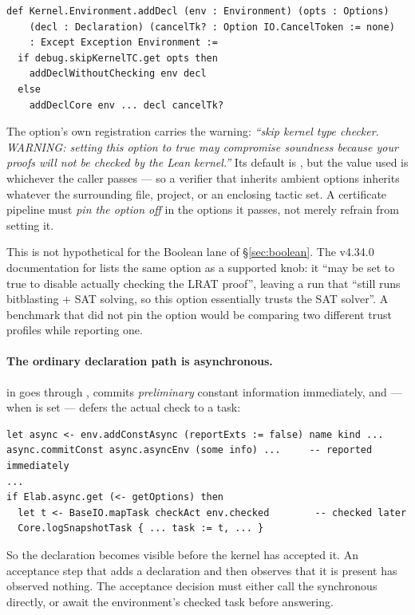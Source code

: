 \begin{lstlisting}
def Kernel.Environment.addDecl (env : Environment) (opts : Options)
    (decl : Declaration) (cancelTk? : Option IO.CancelToken := none)
    : Except Exception Environment :=
  if debug.skipKernelTC.get opts then
    addDeclWithoutChecking env decl
  else
    addDeclCore env ... decl cancelTk?
\end{lstlisting}

The option's own registration carries the warning: \emph{``skip kernel type
checker. WARNING: setting this option to true may compromise soundness because
your proofs will not be checked by the Lean kernel.''} Its default is
, but the value used is whichever  the caller passes
--- so a verifier that inherits ambient options inherits whatever the
surrounding file, project, or an enclosing tactic set. A certificate pipeline
must \emph{pin the option off} in the options it passes, not merely refrain
from setting it.

This is not hypothetical for the Boolean lane of \S\ref{sec:boolean}. The
v4.34.0 documentation for  lists the same option as a
supported knob: it ``may be set to true to disable actually checking the LRAT
proof'', leaving a run that ``still runs bitblasting + SAT solving, so this
option essentially trusts the SAT solver''. A benchmark that did not pin the
option would be comparing two different trust profiles while reporting one.

\paragraph{The ordinary declaration path is asynchronous.}
 in  goes through ,
commits \emph{preliminary} constant information immediately, and --- when
 is set --- defers the actual check to a task:

\begin{lstlisting}
let async <- env.addConstAsync (reportExts := false) name kind ...
async.commitConst async.asyncEnv (some info) ...     -- reported immediately
...
if Elab.async.get (<- getOptions) then
  let t <- BaseIO.mapTask checkAct env.checked        -- checked later
  Core.logSnapshotTask { ... task := t, ... }
\end{lstlisting}

So the declaration becomes visible before the kernel has accepted it.
An acceptance step that adds a declaration and then observes that it is present
has observed nothing. The acceptance decision must either call the synchronous
 directly, or await the environment's checked
task before answering.

